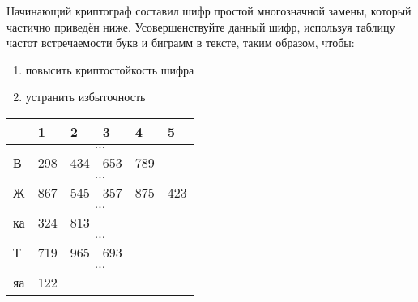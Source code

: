 \begin{problem}
  Начинающий криптограф составил шифр простой многозначной замены, который
  частично приведён ниже. Усовершенствуйте данный шифр, используя таблицу
  частот встречаемости букв и биграмм в тексте, таким образом, чтобы:

  \begin{enumerate}
    \item повысить криптостойкость шифра
    \item устранить избыточность
  \end{enumerate}

  \begin{table}[H]
    \centering
    \begin{tabular}{|l|l|l|l|l|l|}
      \hline
      & 1   & 2   & 3   & 4   & 5   \\ \hline
      \multicolumn{6}{|c|}{$\dots$}        \\ \hline
      В  & 298 & 434 & 653 & 789 &     \\ \hline
      \multicolumn{6}{|c|}{$\dots$}        \\ \hline
      Ж  & 867 & 545 & 357 & 875 & 423 \\ \hline
      \multicolumn{6}{|c|}{$\dots$}        \\ \hline
      ка & 324 & 813 &     &     &     \\ \hline
      \multicolumn{6}{|c|}{$\dots$}        \\ \hline
      Т  & 719 & 965 & 693 &     &     \\ \hline
      \multicolumn{6}{|c|}{$\dots$}        \\ \hline
      яа & 122 &     &     &     &     \\ \hline
    \end{tabular}
  \end{table}

\end{problem}

